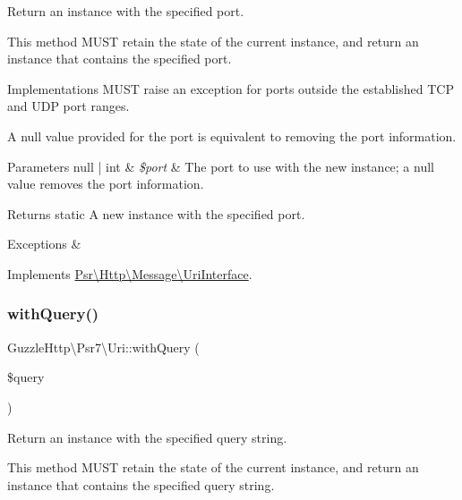 Return an instance with the specified port.

This method M\+U\+ST retain the state of the current instance, and return an instance that contains the specified port.

Implementations M\+U\+ST raise an exception for ports outside the established T\+CP and U\+DP port ranges.

A null value provided for the port is equivalent to removing the port information.


\begin{DoxyParams}[1]{Parameters}
null | int & {\em \$port} & The port to use with the new instance; a null value removes the port information. \\
\hline
\end{DoxyParams}
\begin{DoxyReturn}{Returns}
static A new instance with the specified port. 
\end{DoxyReturn}

\begin{DoxyExceptions}{Exceptions}
{\em } & \\
\hline
\end{DoxyExceptions}


Implements \hyperlink{interfacePsr_1_1Http_1_1Message_1_1UriInterface_aed81cb605b9bec89404a78ff550125a5}{Psr\textbackslash{}\+Http\textbackslash{}\+Message\textbackslash{}\+Uri\+Interface}.

\mbox{\label{classGuzzleHttp_1_1Psr7_1_1Uri_a7b73f53c542c9508b14d5f002699560e}} 
\subsubsection{\texorpdfstring{with\+Query()}{withQuery()}}
{\footnotesize\ttfamily Guzzle\+Http\textbackslash{}\+Psr7\textbackslash{}\+Uri\+::with\+Query (\begin{DoxyParamCaption}\item[{}]{\$query }\end{DoxyParamCaption})}

Return an instance with the specified query string.

This method M\+U\+ST retain the state of the current instance, and return an instance that contains the specified query string.

